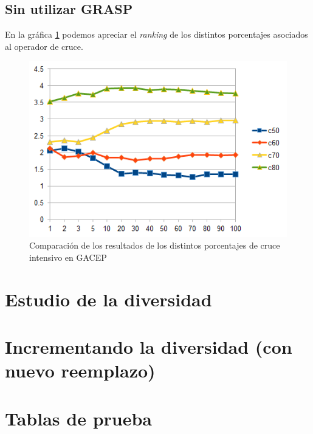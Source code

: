 \subsection{Sin utilizar GRASP}

En la gráfica \ref{fig:GACEPcwoGRASP} podemos apreciar el \textit{ranking} de los distintos porcentajes asociados al operador de cruce.

\begin{figure}[h]
		\centering
		\includegraphics[scale=1]{imagenes/Experimental/GACEPcwoGRASP.png}
        \caption{Comparación de los resultados de los distintos porcentajes de cruce intensivo en GACEP}
        \label{fig:GACEPcwoGRASP}
\end{figure}

\section{Estudio de la diversidad}



\section{Incrementando la diversidad (con nuevo reemplazo)}



\section{Tablas de prueba}

































